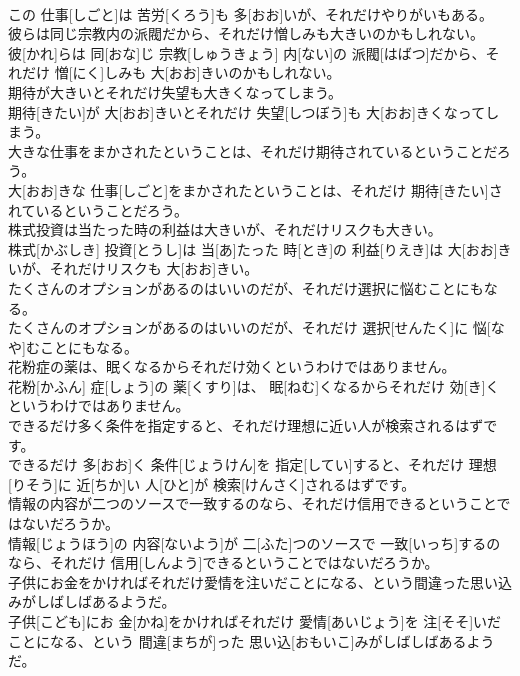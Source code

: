 \documentclass[8pt]{extreport}
\begin{document}
\begin{CJK}{UTF8}{min}
\\	この 仕事[しごと]は 苦労[くろう]も 多[おお]いが、それだけやりがいもある。
\\	彼らは同じ宗教内の派閥だから、それだけ憎しみも大きいのかもしれない。	
\\	彼[かれ]らは 同[おな]じ 宗教[しゅうきょう] 内[ない]の 派閥[はばつ]だから、それだけ 憎[にく]しみも 大[おお]きいのかもしれない。
\\	期待が大きいとそれだけ失望も大きくなってしまう。	
\\	期待[きたい]が 大[おお]きいとそれだけ 失望[しつぼう]も 大[おお]きくなってしまう。
\\	大きな仕事をまかされたということは、それだけ期待されているということだろう。	
\\	大[おお]きな 仕事[しごと]をまかされたということは、それだけ 期待[きたい]されているということだろう。
\\	株式投資は当たった時の利益は大きいが、それだけリスクも大きい。	
\\	株式[かぶしき] 投資[とうし]は 当[あ]たった 時[とき]の 利益[りえき]は 大[おお]きいが、それだけリスクも 大[おお]きい。
\\	たくさんのオプションがあるのはいいのだが、それだけ選択に悩むことにもなる。	
\\	たくさんのオプションがあるのはいいのだが、それだけ 選択[せんたく]に 悩[なや]むことにもなる。
\\	花粉症の薬は、眠くなるからそれだけ効くというわけではありません。	
\\	花粉[かふん] 症[しょう]の 薬[くすり]は、 眠[ねむ]くなるからそれだけ 効[き]くというわけではありません。
\\	できるだけ多く条件を指定すると、それだけ理想に近い人が検索されるはずです。	
\\	できるだけ 多[おお]く 条件[じょうけん]を 指定[してい]すると、それだけ 理想[りそう]に 近[ちか]い 人[ひと]が 検索[けんさく]されるはずです。
\\	情報の内容が二つのソースで一致するのなら、それだけ信用できるということではないだろうか。	
\\	情報[じょうほう]の 内容[ないよう]が 二[ふた]つのソースで 一致[いっち]するのなら、それだけ 信用[しんよう]できるということではないだろうか。
\\	子供にお金をかければそれだけ愛情を注いだことになる、という間違った思い込みがしばしばあるようだ。	
\\	子供[こども]にお 金[かね]をかければそれだけ 愛情[あいじょう]を 注[そそ]いだことになる、という 間違[まちが]った 思い込[おもいこ]みがしばしばあるようだ。

\end{CJK}
\end{document}
